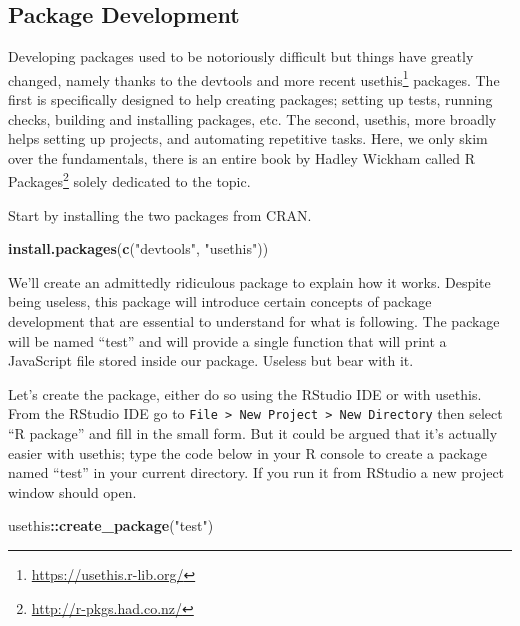 \documentclass[
]{krantz}
\makeatletter
\newenvironment{Shaded}{\begin{snugshade}}{\end{snugshade}}
\newcommand{\KeywordTok}[1]{\textcolor[rgb]{0.27,0.27,0.27}{\textbf{#1}}}
\newcommand{\NormalTok}[1]{#1}
\newcommand{\OperatorTok}[1]{\textcolor[rgb]{0.43,0.43,0.43}{\textbf{#1}}}
\newcommand{\StringTok}[1]{\textcolor[rgb]{0.5,0.5,0.5}{#1}}
\renewcommand{\href}[2]{#2\footnote{\url{#1}}}
\newenvironment{kframe}{%
\medskip{}
\setlength{\fboxsep}{.8em}
 \def\at@end@of@kframe{}%
 \ifinner\ifhmode%
  \def\at@end@of@kframe{\end{minipage}}%
  \begin{minipage}{\columnwidth}%
 \fi\fi%
 \def\FrameCommand##1{\hskip\@totalleftmargin \hskip-\fboxsep
 \colorbox{shadecolor}{##1}\hskip-\fboxsep
     \hskip-\linewidth \hskip-\@totalleftmargin \hskip\columnwidth}%
 \MakeFramed {\advance\hsize-\width
   \@totalleftmargin\z@ \linewidth\hsize
   \@setminipage}}%
 {\par\unskip\endMakeFramed%
 \at@end@of@kframe}
\renewenvironment{Shaded}{\begin{kframe}}{\end{kframe}}
\makeatother
\begin{document}
\hypertarget{package-development}{%
\subsection*{Package Development}\label{package-development}}


Developing packages used to be notoriously difficult but things have greatly changed, namely thanks to the devtools and more recent \href{https://usethis.r-lib.org/}{usethis} \citep{R-usethis} packages. The first is specifically designed to help creating packages; setting up tests, running checks, building and installing packages, etc. The second, usethis, more broadly helps setting up projects, and automating repetitive tasks. Here, we only skim over the fundamentals, there is an entire book by Hadley Wickham called \href{http://r-pkgs.had.co.nz/}{R Packages} solely dedicated to the topic.

Start by installing the two packages from CRAN.

\begin{Shaded}
\begin{Highlighting}[]
\KeywordTok{install.packages}\NormalTok{(}\KeywordTok{c}\NormalTok{(}\StringTok{"devtools"}\NormalTok{, }\StringTok{"usethis"}\NormalTok{))}
\end{Highlighting}
\end{Shaded}

We'll create an admittedly ridiculous package to explain how it works. Despite being useless, this package will introduce certain concepts of package development that are essential to understand for what is following. The package will be named ``test'' and will provide a single function that will print a JavaScript file stored inside our package. Useless but bear with it.

Let's create the package, either do so using the RStudio IDE or with usethis. From the RStudio IDE go to \texttt{File\ \textgreater{}\ New\ Project\ \textgreater{}\ New\ Directory} then select ``R package'' and fill in the small form. But it could be argued that it's actually easier with usethis; type the code below in your R console to create a package named ``test'' in your current directory. If you run it from RStudio a new project window should open.

\begin{Shaded}
\begin{Highlighting}[]
\NormalTok{usethis}\OperatorTok{::}\KeywordTok{create\_package}\NormalTok{(}\StringTok{"test"}\NormalTok{)}
\end{Highlighting}
\end{Shaded}
\end{document}
